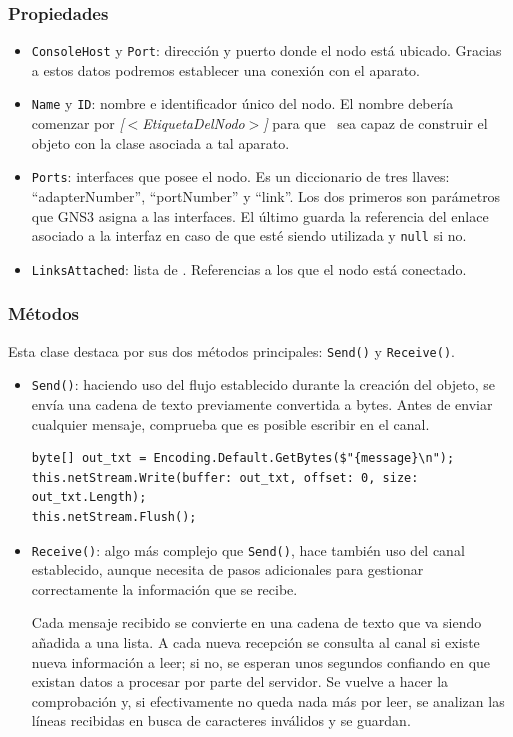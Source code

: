\subsubsection{Propiedades}
\begin{itemize}
\item \texttt{ConsoleHost} y \texttt{Port}: dirección y puerto donde el nodo está ubicado. Gracias a estos datos podremos establecer una conexión con el aparato.
\item \texttt{Name} y \texttt{ID}: nombre e identificador único del nodo. El nombre debería comenzar por \textit{[$<$EtiquetaDelNodo$>$]} para que \GNSCS~sea capaz de construir el objeto con la clase asociada a tal aparato.
\item \texttt{Ports}: interfaces que posee el nodo. Es un diccionario de tres llaves: ``adapterNumber'', ``portNumber'' y ``link''. Los dos primeros son parámetros que GNS3 asigna a las interfaces. El último guarda la referencia del enlace asociado a la interfaz en caso de que esté siendo utilizada y \texttt{null} si no.
\item \texttt{LinksAttached}: lista de \LINK. Referencias a los que el nodo está conectado.
\end{itemize}

\subsubsection{Métodos}
Esta clase destaca por sus dos métodos principales: \texttt{Send()} y \texttt{Receive()}.

\begin{itemize}
\item \texttt{Send()}: haciendo uso del flujo establecido durante la creación del objeto, se envía una cadena de texto previamente convertida a bytes. Antes de enviar cualquier mensaje, comprueba que es posible escribir en el canal.

\begin{lstlisting}[language={[Sharp]C}, caption={Envío de mensajes a un nodo}, label={node3}]
byte[] out_txt = Encoding.Default.GetBytes($"{message}\n");
this.netStream.Write(buffer: out_txt, offset: 0, size: out_txt.Length);
this.netStream.Flush();
\end{lstlisting}

\item \texttt{Receive()}: algo más complejo que \texttt{Send()}, hace también uso del canal establecido, aunque necesita de pasos adicionales para gestionar correctamente la información que se recibe.

Cada mensaje recibido se convierte en una cadena de texto que va siendo añadida a una lista. A cada nueva recepción se consulta al canal si existe nueva información a leer; si no, se esperan unos segundos confiando en que existan datos a procesar por parte del servidor. Se vuelve a hacer la comprobación y, si efectivamente no queda nada más por leer, se analizan las líneas recibidas en busca de caracteres inválidos y se guardan. 

\end{itemize}


